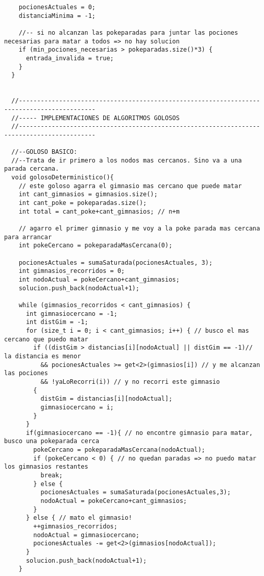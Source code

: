 \begin{lstlisting}
    pocionesActuales = 0;
    distanciaMinima = -1;

    //-- si no alcanzan las pokeparadas para juntar las pociones necesarias para matar a todos => no hay solucion
    if (min_pociones_necesarias > pokeparadas.size()*3) {
      entrada_invalida = true;
    }
  }


  //-------------------------------------------------------------------------------------------
  //----- IMPLEMENTACIONES DE ALGORITMOS GOLOSOS
  //-------------------------------------------------------------------------------------------

  //--GOLOSO BASICO:
  //--Trata de ir primero a los nodos mas cercanos. Sino va a una parada cercana.
  void golosoDeterministico(){
    // este goloso agarra el gimnasio mas cercano que puede matar
    int cant_gimnasios = gimnasios.size();
    int cant_poke = pokeparadas.size();
    int total = cant_poke+cant_gimnasios; // n+m

    // agarro el primer gimnasio y me voy a la poke parada mas cercana para arrancar
    int pokeCercano = pokeparadaMasCercana(0);

    pocionesActuales = sumaSaturada(pocionesActuales, 3);
    int gimnasios_recorridos = 0;
    int nodoActual = pokeCercano+cant_gimnasios;
    solucion.push_back(nodoActual+1);

    while (gimnasios_recorridos < cant_gimnasios) {
      int gimnasiocercano = -1;
      int distGim = -1;
      for (size_t i = 0; i < cant_gimnasios; i++) { // busco el mas cercano que puedo matar
        if ((distGim > distancias[i][nodoActual] || distGim == -1)// la distancia es menor
          && pocionesActuales >= get<2>(gimnasios[i]) // y me alcanzan las pociones
          && !yaLoRecorri(i)) // y no recorri este gimnasio
        {
          distGim = distancias[i][nodoActual];
          gimnasiocercano = i;
        }
      }
      if(gimnasiocercano == -1){ // no encontre gimnasio para matar, busco una pokeparada cerca
        pokeCercano = pokeparadaMasCercana(nodoActual);
        if (pokeCercano < 0) { // no quedan paradas => no puedo matar los gimnasios restantes
          break;
        } else {
          pocionesActuales = sumaSaturada(pocionesActuales,3);
          nodoActual = pokeCercano+cant_gimnasios;
        }
      } else { // mato el gimnasio!
        ++gimnasios_recorridos;
        nodoActual = gimnasiocercano;
        pocionesActuales -= get<2>(gimnasios[nodoActual]);
      }
      solucion.push_back(nodoActual+1);
    }


\end{lstlisting}
